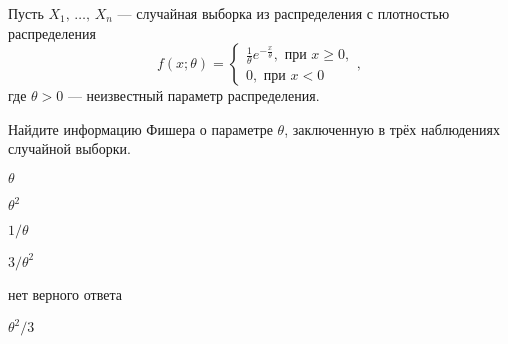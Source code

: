 
\begin{question}
Пусть \(X_1, \, \ldots, \, X_n\) --- случайная выборка из распределения
с плотностью распределения \[
f(x; \theta) =
\begin{cases}
\frac{1}{\theta} e^{-\frac{x}{\theta}}, \text{ при } x \geq 0, \\
0, \text{ при } x < 0
\end{cases},
\] где \(\theta > 0\) --- неизвестный параметр распределения.

Найдите информацию Фишера о параметре \(\theta\), заключенную в трёх
наблюдениях случайной выборки.
\begin{answerlist}
  \item \(\theta\)
  \item \(\theta^2\)
  \item \(1 / \theta\)
  \item \(3 / \theta^2\)
  \item нет верного ответа
  \item \(\theta^2 / 3\)
\end{answerlist}
\end{question}


